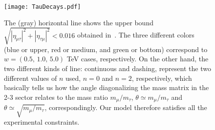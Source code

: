 \documentclass[aps,prd,groupaddress,floatfix,tighten,nofootinbib,showpacs,
amsfonts,superscriptaddress]{revtex4}
\begin{document}
{\begin{figure}[H]
\centering
\texttt{[image: TauDecays.pdf]}
\caption{The (gray) horizontal line shows the upper bound $\sqrt{|\eta_{\mu \tau}|^2 + |\eta_{\tau \mu}|^2 } < 0.016$ obtained in~\cite{Harnik:2012pb}. The three different colors (blue or upper, red or medium, and green or bottom) correspond to $w = (0.5,\, 1.0, \, 5.0)$ TeV cases, respectively. On the other hand, the two different kinds of line: continuous and dashing, represent the two different values of $n$ used, $n=0$ and $n=2$, respectively, which basically tells us how the angle diagonalizing the mass matrix in the 2-3 sector relates to the mass ratio $m_\mu / m_\tau$, $\theta \simeq m_\mu / m_\tau$ and $\theta \simeq \sqrt{m_\mu / m_\tau}$, correspondingly. Our model therefore satisfies all the experimental constraints.} 
\label{Taus}
\end{figure}


}
\end{document}

